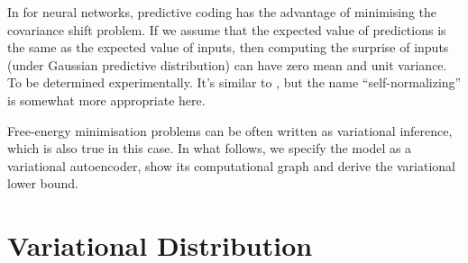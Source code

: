 \documentclass[]{article}
\begin{document}
	In for neural networks, predictive coding has the advantage of minimising the covariance shift problem. If we assume that the expected value of predictions is the same as the expected value of inputs, then computing the surprise of inputs (under Gaussian predictive distribution) can have zero mean and unit variance. To be determined experimentally. It's similar to \cite{Klambauer2017}, but the name ``self-normalizing'' is somewhat more appropriate here.

	Free-energy minimisation problems can be often written as variational inference, which is also true in this case. In what follows, we specify the model as a variational autoencoder, show its computational graph and derive the variational lower bound.

\section{Variational Distribution}
\end{document}
